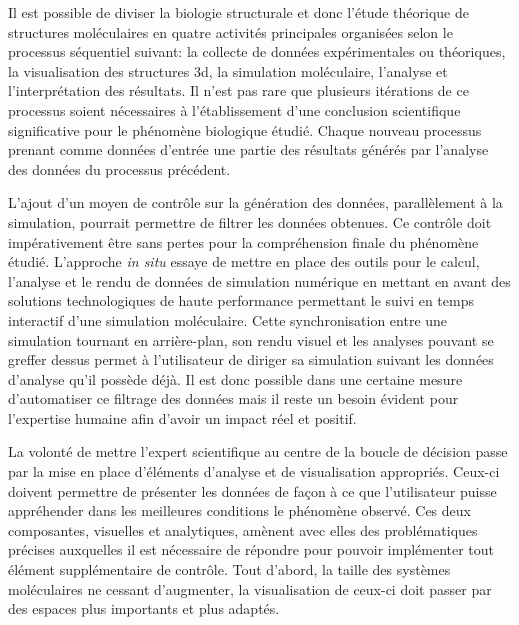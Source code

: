 Il est possible de diviser la biologie structurale et donc l'étude théorique de structures moléculaires en quatre activités principales organisées selon le processus séquentiel suivant: la collecte de données expérimentales ou théoriques, la visualisation des structures 3d, la simulation moléculaire, l’analyse et l’interprétation des résultats. Il n'est pas rare que plusieurs itérations de ce processus soient nécessaires à l'établissement d'une conclusion scientifique significative pour le phénomène biologique étudié. Chaque nouveau processus prenant comme données d'entrée une partie des résultats générés par l'analyse des données du processus précédent.  

L'ajout d'un moyen de contrôle sur la génération des données, parallèlement à la simulation, pourrait permettre de filtrer les données obtenues. Ce contrôle doit impérativement être sans pertes pour la compréhension finale du phénomène étudié. L'approche \textit{in situ} essaye de mettre en place des outils pour le calcul, l'analyse et le rendu de données de simulation numérique en mettant en avant des solutions technologiques de haute performance permettant le suivi en temps interactif d'une simulation moléculaire. Cette synchronisation entre une simulation tournant en arrière-plan, son rendu visuel et les analyses pouvant se greffer dessus permet à l'utilisateur de diriger sa simulation suivant les données d'analyse qu'il possède déjà.
Il est donc possible dans une certaine mesure d'automatiser ce filtrage des données mais il reste un besoin évident pour l'expertise humaine afin d'avoir un impact réel et positif. 

La volonté de mettre l'expert scientifique au centre de la boucle de décision passe par la mise en place d'éléments d'analyse et de visualisation appropriés. Ceux-ci doivent permettre de présenter les données de façon à ce que l'utilisateur puisse appréhender dans les meilleures conditions le phénomène observé. Ces deux composantes, visuelles et analytiques, amènent avec elles des problématiques précises auxquelles il est nécessaire de répondre pour pouvoir implémenter tout élément supplémentaire de contrôle. Tout d'abord, la taille des systèmes moléculaires ne cessant d'augmenter, la visualisation de ceux-ci doit passer par des espaces plus importants et plus adaptés.

